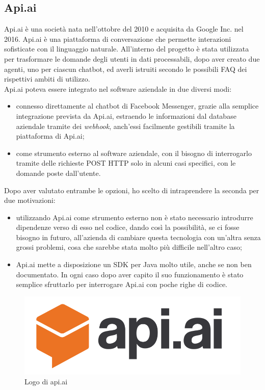 \subsection{Api.ai}
Api.ai è una società nata nell'ottobre del 2010 e acquisita da Google Inc. nel 2016. Api.ai è una piattaforma di conversazione
che permette interazioni sofisticate con il linguaggio naturale. All'interno del progetto è stata utilizzata per trasformare le domande degli utenti in dati processabili, dopo aver creato due agenti, uno per ciascun \gls{chatbot}, ed averli istruiti secondo le possibili \gls{FAQ} dei rispettivi ambiti di utilizzo.\\
Api.ai poteva essere integrato nel software aziendale in due diversi modi:
\begin{itemize}
	\item connesso direttamente al \gls{chatbot} di Facebook Messenger, grazie alla semplice integrazione prevista da Api.ai, estraendo le informazioni dal database aziendale tramite dei \emph{webhook}, anch'essi facilmente gestibili tramite la piattaforma di Api.ai;
	\item come strumento esterno al software aziendale, con il bisogno di interrogarlo tramite delle richieste POST HTTP solo in alcuni casi specifici, con le domande poste dall'utente.
\end{itemize} 
Dopo aver valutato entrambe le opzioni, ho scelto di intraprendere la seconda per due motivazioni:
\begin{itemize}
	\item utilizzando Api.ai come strumento esterno non è stato necessario introdurre dipendenze verso di esso nel codice, dando così la possibilità, se ci fosse bisogno in futuro, all'azienda di cambiare questa tecnologia con un'altra senza grossi problemi, cosa che sarebbe stata molto più difficile nell'altro caso;
	\item Api.ai mette a disposizione un SDK per Java molto utile, anche se non ben documentato. In ogni caso dopo aver capito il suo funzionamento è stato semplice sfruttarlo per interrogare Api.ai con poche righe di codice. 
\end{itemize}
\begin{figure}[h]
	\centering
	\includegraphics[scale=0.2]{../Immagini/apiai.png}
	\caption{Logo di api.ai}
\end{figure}
